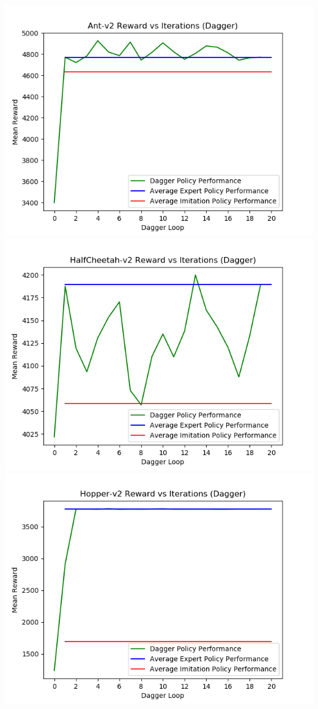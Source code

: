 \documentclass{article}
\begin{document}
    \noindent\includegraphics[scale=0.4]{Ant-v2Dagger}
    \includegraphics[scale=0.4]{HalfCheetah-v2Dagger}\\
    \includegraphics[scale=0.4]{Hopper-v2Dagger}
\end{document}

